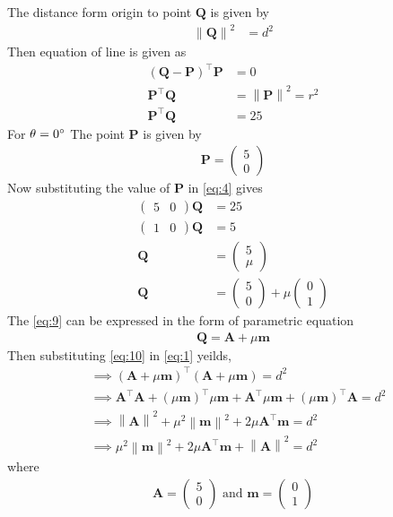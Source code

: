 \documentclass[12pt]{article}
\providecommand{\brak}[1]{\ensuremath{\left(#1\right)}}
\providecommand{\norm}[1]{\left\lVert#1\right\rVert}
\newcommand{\myvec}[1]{\ensuremath{\begin{pmatrix}#1\end{pmatrix}}}
\let\vec\mathbf
\begin{document}
\begin{enumerate}
\begin{table}[ht!]\centering

\caption{}
\label{Table-1} 
\end{table}
		The distance form origin to point $\vec{Q}$ is given by
\begin{align}
	\norm{\vec{Q}}^2&=d^2\label{eq:1}
\end{align}
Then equation of line is given as
\begin{align}
\brak{\vec{Q}-\vec{P}}^{\top}\vec{P}&=0\\
\vec{P}^{\top}\vec{Q}&=\norm{\vec{P}}^2=r^2\\
	\vec{P}^{\top}\vec{Q}&=25\label{eq:4}
\end{align}
For $\theta=0\degree$ The point $\vec{P}$ is given by
\begin{align}
\vec{P}=\myvec{5\\0}
\end{align}
Now substituting the value of $\vec{P}$ in \eqref{eq:4} gives
\begin{align}
\myvec{5&0}\vec{Q}&=25\\
\myvec{1&0}\vec{Q}&=5\\
\vec{Q}&=\myvec{5\\ \mu}\\
	\vec{Q}&=\myvec{5\\0}+\mu\myvec{0\\1}\label{eq:9}
\end{align}
		The \eqref{eq:9} can be expressed in the form of parametric equation
\begin{align}
	\vec{Q}=\vec{A}+\mu\vec{m}\label{eq:10}
\end{align}
		Then substituting \eqref{eq:10} in \eqref{eq:1} yeilds,
\begin{align}
	&\implies\brak{\vec{A}+\mu\vec{m}}^{\top}\brak{\vec{A}+\mu\vec{m}}=d^2\\
	&\implies \vec{A}^{\top}\vec{A}+\brak{\mu\vec{m}}^{\top}\mu\vec{m}+\vec{A}^{\top}\mu\vec{m}+\brak{\mu\vec{m}}^{\top}\vec{A}=d^2\\
	&\implies \norm{\vec{A}}^2+\mu^2\norm{\vec{m}}^2+2\mu\vec{A}^{\top}\vec{m}=d^2\\
	&\implies \mu^2\norm{\vec{m}}^2+2\mu\vec{A}^{\top}\vec{m}+\norm{\vec{A}}^2=d^2\label{eq:14}
\end{align}
where
\begin{align}
	\vec{A}=\myvec{5\\0}\text{ and }\vec{m}=\myvec{0\\1}
\end{align}

\end{enumerate}
\end{document}
